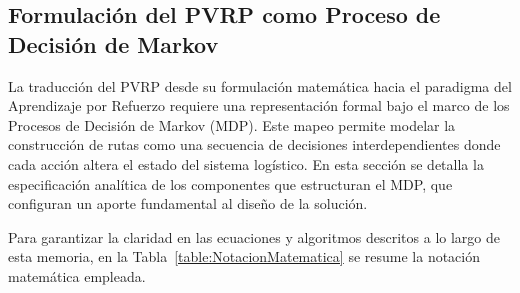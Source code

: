 \subsection{Formulación del PVRP como Proceso de Decisión de Markov} \label{sec:FormulacionMDP}
La traducción del PVRP desde su formulación matemática hacia el paradigma del Aprendizaje por Refuerzo requiere una representación formal bajo el marco de los Procesos de Decisión de Markov (MDP). Este mapeo permite modelar la construcción de rutas como una secuencia de decisiones interdependientes donde cada acción altera el estado del sistema logístico. En esta sección se detalla la especificación analítica de los componentes que estructuran el MDP, que configuran un aporte fundamental al diseño de la solución.

Para garantizar la claridad en las ecuaciones y algoritmos descritos a lo largo de esta memoria, en la Tabla~\ref{table:NotacionMatematica} se resume la notación matemática empleada.


